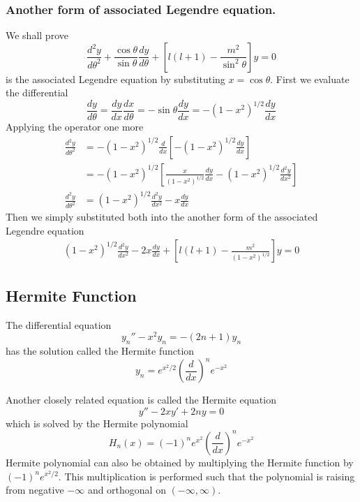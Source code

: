 \documentclass[../main.tex]{subfiles}
\begin{document}
\subsubsection*{Another form of associated Legendre equation.} We shall prove
\begin{equation*}
    \frac{d^2y}{d\theta^2} +\frac{\cos \theta}{\sin\theta}\frac{dy}{d\theta} +\left[l(l+1)-\frac{m^2}{\sin^2\theta} \right]y =0
\end{equation*}
is the associated Legendre equation by substituting $x=\cos\theta$.
First we evaluate the differential
\begin{equation*}
    \frac{dy}{d\theta}=\frac{dy}{dx}\frac{dx}{d\theta}=-\sin\theta\frac{dy}{dx}=-(1-x^2)^{1/2}\frac{dy}{dx}
\end{equation*}
Applying the operator one more
\begin{align*}
    \frac{d^2y}{d\theta^2} & =-(1-x^2)^{1/2}\frac{d}{dx}\left[-(1-x^2)^{1/2}\frac{dy}{dx}\right]                              \\
                           & =-(1-x^2)^{1/2}\left[\frac{x}{(1-x^2)^{1/2}}\frac{dy}{dx} -(1-x^2)^{1/2}\frac{d^2y}{dx^2}\right] \\
    \frac{d^2y}{d\theta^2} & =(1-x^2)^{1/2}\frac{d^2y}{dx^2}-x\frac{dy}{dx}
\end{align*}
Then we simply substituted both into the another form of the associated Legendre equation
\begin{align*}
    (1-x^2)^{1/2}\frac{d^2y}{dx^2}-2x\frac{dy}{dx}+\left[l(l+1)-\frac{m^2}{(1-x^2)^{1/2}} \right]y=0
\end{align*}

\subsection*{Hermite Function}
The diﬀerential equation
\begin{equation*}
    y_n''-x^2y_n=-(2n+1)y_n
\end{equation*}
has the solution called the Hermite function
\begin{equation*}
    y_n=e^{x^2/2}\left(\frac{d}{dx}\right)^ne^{-x^2}
\end{equation*}

Another closely related equation is called the Hermite equation
\begin{equation*}
    y''-2xy'+2ny=0
\end{equation*}
which is solved by the Hermite polynomial
\begin{equation*}
    H_n(x)=(-1)^ne^{x^2}\left(\frac{d}{dx}\right)^ne^{-x^2}
\end{equation*}
Hermite polynomial can also be obtained by multiplying the Hermite function by $(-1)^ne^{x^2/2}$.
This multiplication is performed such that the polynomial is raising from negative $-\infty$ and orthogonal on $(-\infty,\infty)$.
\end{document}
